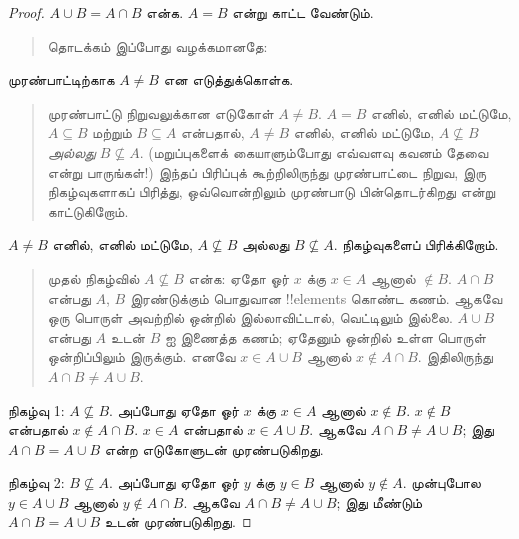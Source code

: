 \documentclass[../../../include/open-logic-section]{subfiles}
\begin{document}
\begin{proof}
  $A \cup B = A \cap B$ என்க. $A = B$
  என்று காட்ட வேண்டும்.
  \begin{quote}
    தொடக்கம் இப்போது வழக்கமானதே:
  \end{quote}
  முரண்பாட்டிற்காக $A \neq B$ என எடுத்துக்கொள்க.
  \begin{quote}
    முரண்பாட்டு நிறுவலுக்கான எடுகோள் $A \neq B$.
    $A = B$ எனில், எனில் மட்டுமே, $A \subseteq B$
    மற்றும் $B \subseteq A$ என்பதால், $A \neq B$
    எனில், எனில் மட்டுமே, $A \nsubseteq B$
    \emph{அல்லது} $B \nsubseteq A$. (மறுப்புகளைக்
    கையாளும்போது எவ்வளவு கவனம் தேவை என்று பாருங்கள்!{})
    இந்தப் பிரிப்புக் கூற்றிலிருந்து முரண்பாட்டை நிறுவ,
    இரு நிகழ்வுகளாகப் பிரித்து, ஒவ்வொன்றிலும்
    முரண்பாடு பின்தொடர்கிறது என்று காட்டுகிறோம்.
  \end{quote}
  $A \neq B$ எனில், எனில் மட்டுமே,
  $A \nsubseteq B$ அல்லது $B \nsubseteq A$.
  நிகழ்வுகளைப் பிரிக்கிறோம்.
  \begin{quote}
    முதல் நிகழ்வில் $A \nsubseteq B$ என்க:
    ஏதோ ஓர் $x$ க்கு $x \in A$ ஆனால்
    $\notin B$. $A \cap B$ என்பது $A$, $B$
    இரண்டுக்கும் பொதுவான !!{element}s கொண்ட கணம்.
    ஆகவே ஒரு பொருள் அவற்றில் ஒன்றில் இல்லாவிட்டால்,
    வெட்டிலும் இல்லை. $A \cup B$ என்பது
    $A$ உடன் $B$ ஐ இணைத்த கணம்; ஏதேனும்
    ஒன்றில் உள்ள பொருள் ஒன்றிப்பிலும் இருக்கும்.
    எனவே $x \in A \cup B$ ஆனால்
    $x \notin A \cap B$. இதிலிருந்து
    $A \cap B \neq A \cup B$.
  \end{quote}

  நிகழ்வு 1: $A \nsubseteq B$. அப்போது
  ஏதோ ஓர் $x$ க்கு $x \in A$ ஆனால்
  $x \notin B$. $x \notin B$ என்பதால்
  $x \notin A \cap B$. $x \in A$ என்பதால்
  $x \in A \cup B$. ஆகவே
  $A \cap B \neq A \cup B$; இது
  $A \cap B = A \cup B$ என்ற எடுகோளுடன்
  முரண்படுகிறது.

  நிகழ்வு 2: $B \nsubseteq A$. அப்போது
  ஏதோ ஓர் $y$ க்கு $y \in B$ ஆனால்
  $y \notin A$. முன்புபோல
  $y \in A \cup B$ ஆனால் $y \notin A \cap B$.
  ஆகவே $A \cap B \neq A \cup B$;
  இது மீண்டும் $A \cap B = A \cup B$
  உடன் முரண்படுகிறது.
\end{proof}
\end{document}
